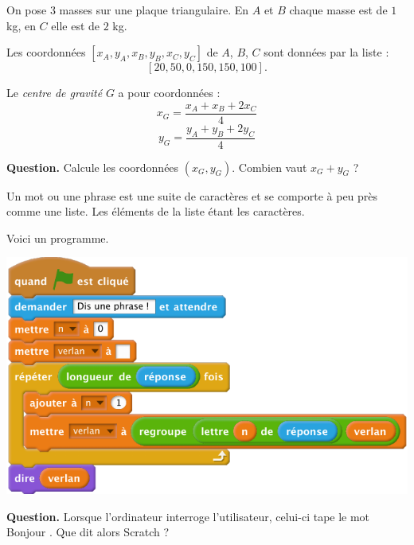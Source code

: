 \documentclass[class=report,crop=false, 12pt]{standalone}
\begin{document}


\begin{enigme}

On pose $3$ masses sur une plaque triangulaire.
En $A$ et $B$ chaque masse est de $1$ kg, en $C$ elle est de $2$ kg.




Les coordonnées $[x_A,y_A,x_B,y_B,x_C,y_C]$ de $A$, $B$, $C$ sont données par la liste :
$$[20,50,0,150,150,100].$$

Le \emph{centre de gravité} $G$ a pour coordonnées :
$$x_G = \frac{x_A+x_B+2x_C}{4}$$
$$y_G = \frac{y_A+y_B+2y_C}{4}$$


\bigskip

\textbf{Question.} Calcule les coordonnées $(x_G,y_G)$. 
Combien vaut $x_G+y_G$ ?
 


\end{enigme}



\begin{enigme}
Un mot ou une phrase est une suite de caractères et se comporte à peu près comme une liste. Les éléments de la liste étant les caractères.


Voici un programme.

\begin{center}
  \includegraphics[scale=\scalebloc,scale=0.7]{code-12-eg2}   
\end{center}


\bigskip

\textbf{Question.} Lorsque l'ordinateur interroge l'utilisateur, celui-ci tape le mot \og Bonjour \fg{}. Que dit alors Scratch ?


\end{enigme}
\end{document}
